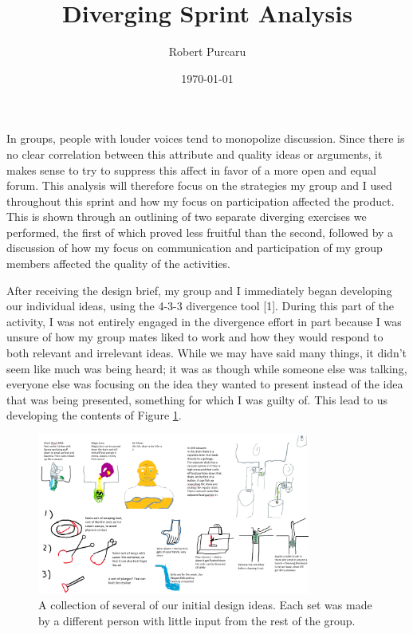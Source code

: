 \documentclass[11pt]{article}
\begin{document}
    \title{Diverging Sprint Analysis}
    \author{Robert Purcaru}
    \date{\today}
    \maketitle


   In groups, people with louder voices tend to monopolize discussion. Since there is no clear correlation between this attribute and quality ideas or arguments, it makes sense to try to suppress this affect in favor of a more open and equal forum. This analysis will therefore focus on the strategies my group and I used throughout this sprint and how my focus on participation affected the product. This is shown through an outlining of two separate diverging exercises we performed, the first of which proved less fruitful than the second, followed by a discussion of how my focus on communication and participation of my group members affected the quality of the activities. 

    After receiving  the design brief, my group and I immediately began developing our individual ideas, using the 4-3-3 divergence tool [1]. During this part of the activity, I was not entirely engaged in the divergence effort in part because I was unsure of how my group mates liked to work and how they would respond to both relevant and irrelevant ideas. While we may have said many things, it didn't seem like much was being heard; it was as though while someone else was talking, everyone else was focusing on the idea they wanted to present instead of the idea that was being presented, something for which I was guilty of. This lead to us developing the contents of Figure \ref{FirstDesigns}.
    
    \begin{figure}[H]
        \centering\includegraphics[width = 0.8\textwidth]{FirstDesigns.PNG}
        \caption{A collection of several of our initial design ideas. Each set was made by a different person with little input from the rest of the group.}
        \label{FirstDesigns}
    \end{figure}
\end{document}
